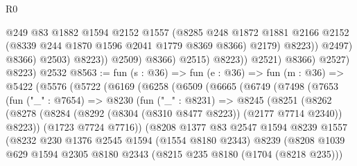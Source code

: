 \begin{lexlean}{R0}
\begin{coremodule}
                                    @249
                                    @83
                                    @1882
                                    @1594
                                    @2152
                                    @1557
                                    (@8285
                                      @248
                                      @1872
                                      @1881
                                      @2166
                                      @2152
                                      (@8339 @244 @1870 @1596 @2041 @1779 @8369 @8366)
                                      @2179)
                                    @8223))
                                @2497)
                              @8366)
                            @2503)
                          @8223))
                      @2509)
                    @8366)
                  @2515)
                @8223))
            @2521)
          @8366)
        @2527)
      @8223)
    @2532
@8563 := fun (s : @36) =>
  fun (e : @36) =>
  fun (m : @36) =>
  @5422
    (@5576
      (@5722
        (@6169
          (@6258
            (@6509
              (@6665
                (@6749
                  (@7498
                    (@7653
                      (fun ("_" : @7654) =>
                      @8230
                        (fun ("_" : @8231) =>
                        @8245
                          (@8251
                            (@8262
                              (@8278
                                (@8284
                                  (@8292 (@8304 (@8310 @8477 @8223)) (@2177 @7714 @2340))
                                  @8223))
                              (@1723 @7724 @7716))
                            (@8208
                              @1377
                              @83
                              @2547
                              @1594
                              @8239
                              @1557
                              (@8232
                                @230
                                @1376
                                @2545
                                @1594
                                (@1554 @8180 @2343)
                                @8239
                                (@8208
                                  @1039
                                  @629
                                  @1594
                                  @2305
                                  @8180
                                  @2343
                                  (@8215 @235 @8180 (@1704 (@8218 @235)))

\end{coremodule}
\end{lexlean}
